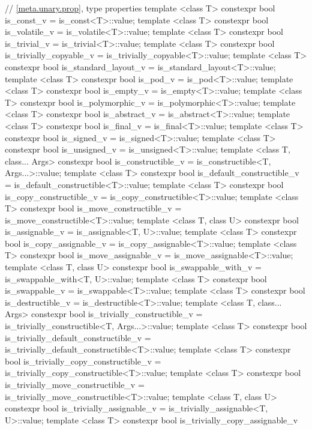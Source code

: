 \begin{codeblock}
{  // \ref{meta.unary.prop}, type properties
  template <class T> constexpr bool is_const_v
    = is_const<T>::value;
  template <class T> constexpr bool is_volatile_v
    = is_volatile<T>::value;
  template <class T> constexpr bool is_trivial_v
    = is_trivial<T>::value;
  template <class T> constexpr bool is_trivially_copyable_v
    = is_trivially_copyable<T>::value;
  template <class T> constexpr bool is_standard_layout_v
    = is_standard_layout<T>::value;
  template <class T> constexpr bool is_pod_v
    = is_pod<T>::value;
  template <class T> constexpr bool is_empty_v
    = is_empty<T>::value;
  template <class T> constexpr bool is_polymorphic_v
    = is_polymorphic<T>::value;
  template <class T> constexpr bool is_abstract_v
    = is_abstract<T>::value;
  template <class T> constexpr bool is_final_v
    = is_final<T>::value;
  template <class T> constexpr bool is_signed_v
    = is_signed<T>::value;
  template <class T> constexpr bool is_unsigned_v
    = is_unsigned<T>::value;
  template <class T, class... Args> constexpr bool is_constructible_v
    = is_constructible<T, Args...>::value;
  template <class T> constexpr bool is_default_constructible_v
    = is_default_constructible<T>::value;
  template <class T> constexpr bool is_copy_constructible_v
    = is_copy_constructible<T>::value;
  template <class T> constexpr bool is_move_constructible_v
    = is_move_constructible<T>::value;
  template <class T, class U> constexpr bool is_assignable_v
    = is_assignable<T, U>::value;
  template <class T> constexpr bool is_copy_assignable_v
    = is_copy_assignable<T>::value;
  template <class T> constexpr bool is_move_assignable_v
    = is_move_assignable<T>::value;
  template <class T, class U> constexpr bool is_swappable_with_v
    = is_swappable_with<T, U>::value;
  template <class T> constexpr bool is_swappable_v
    = is_swappable<T>::value;
  template <class T> constexpr bool is_destructible_v
    = is_destructible<T>::value;
  template <class T, class... Args> constexpr bool is_trivially_constructible_v
    = is_trivially_constructible<T, Args...>::value;
  template <class T> constexpr bool is_trivially_default_constructible_v
    = is_trivially_default_constructible<T>::value;
  template <class T> constexpr bool is_trivially_copy_constructible_v
    = is_trivially_copy_constructible<T>::value;
  template <class T> constexpr bool is_trivially_move_constructible_v
    = is_trivially_move_constructible<T>::value;
  template <class T, class U> constexpr bool is_trivially_assignable_v
    = is_trivially_assignable<T, U>::value;
  template <class T> constexpr bool is_trivially_copy_assignable_v
}
\end{codeblock}
